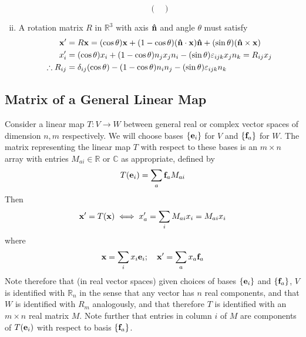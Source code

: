 \begin{enumerate}[(i)]
\[\begin{pmatrix}
		      \end{pmatrix} \]
	\item A rotation matrix $R$ in $\mathbb R^3$ with axis $\vu n$ and angle $\theta$ must satisfy
	      \begin{align*}
		      \vb x'            & = R\vb x = (\cos \theta)\vb x + (1 - \cos \theta)(\vu n \cdot \vb x)\vu n + (\sin \theta)(\vu n \times \vb x) \\
		      x_i'              & = (\cos \theta)x_i + (1 - \cos \theta)n_j x_j n_i - (\sin \theta) \varepsilon_{ijk}x_j n_k = R_{ij} x_j       \\
		      \therefore R_{ij} & = \delta_{ij}(\cos \theta) - (1 - \cos \theta)n_in_j - (\sin \theta)\varepsilon_{ijk} n_k
	      \end{align*}
\end{enumerate}

\subsection{Matrix of a General Linear Map}
Consider a linear map $T: V \to W$ between general real or complex vector spaces of dimension $n, m$ respectively. We will choose bases $\{ \vb e_i \}$ for $V$ and $\{ \vb f_a \}$ for $W$. The matrix representing the linear map $T$ with respect to these bases is an $m \times n$ array with entries $M_{ai} \in \mathbb R$ or $\mathbb C$ as appropriate, defined by
\[ T(\vb e_i) = \sum_a \vb f_a M_{ai} \]
Then
\[ \vb x' = T(\vb x) \iff x_a' = \sum_i M_{ai}x_i = M_{ai}x_i \]
where
\[ \vb x = \sum_i x_i \vb e_i;\quad \vb x' = \sum_a x_a \vb f_a \]
Note therefore that (in real vector spaces) given choices of bases $\{ \vb e_i \}$ and $\{ \vb f_a \}$, $V$ is identified with $\mathbb R_n$ in the sense that any vector has $n$ real components, and that $W$ is identified with $R_m$ analogously, and that therefore $T$ is identified with an $m\times n$ real matrix $M$. Note further that entries in column $i$ of $M$ are components of $T(\vb e_i)$ with respect to basis $\{ \vb f_a \}$.
